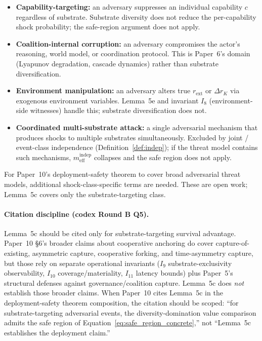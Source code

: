 \documentclass{article}
\newcommand{\rext}{r_{\mathrm{ext}}}
\newcommand{\mindep}{m_{\mathrm{eff}}^{\mathrm{indep}}}
\begin{document}
\begin{itemize}
\item \textbf{Capability-targeting:} an adversary suppresses an
  individual capability $c$ regardless of substrate.  Substrate
  diversity does not reduce the per-capability shock probability;
  the safe-region argument does not apply.
\item \textbf{Coalition-internal corruption:} an adversary
  compromises the actor's reasoning, world model, or coordination
  protocol.  This is Paper~6's domain (Lyapunov degradation,
  cascade dynamics) rather than substrate diversification.
\item \textbf{Environment manipulation:} an adversary alters true
  $\rext$ or $\Delta r_K$ via exogenous environment variables.
  Lemma~5e and invariant $I_8$ (environment-side witnesses) handle
  this; substrate diversification does not.
\item \textbf{Coordinated multi-substrate attack:} a single
  adversarial mechanism that produces shocks to multiple
  substrates simultaneously.  Excluded by joint / event-class
  independence (Definition~\ref{def:indep}); if the threat model
  contains such mechanisms, $\mindep$ collapses and the safe
  region does not apply.
\end{itemize}

For Paper~10's deployment-safety theorem to cover broad adversarial
threat models, additional shock-class-specific terms are needed.
These are open work; Lemma~5c covers only the substrate-targeting
class.

\paragraph{Citation discipline (codex Round B Q5).}
Lemma~5c should be cited only for substrate-targeting survival
advantage.  Paper~10 \S6's broader claims about cooperative anchoring
do cover capture-of-existing, asymmetric capture, cooperative
forking, and time-asymmetry capture, but those rely on separate
operational invariants ($I_9$ substrate-exclusivity observability,
$I_{10}$ coverage/materiality, $I_{11}$ latency bounds) plus Paper~5's
structural defenses against governance/coalition capture.  Lemma~5c
does \emph{not} establish those broader claims.  When Paper~10 cites
Lemma~5c in the deployment-safety theorem composition, the citation
should be scoped: ``for substrate-targeting adversarial events, the
diversity-domination value comparison admits the safe region of
Equation~\ref{eq:safe_region_concrete},'' not ``Lemma~5c establishes
the deployment claim.''
\end{document}
